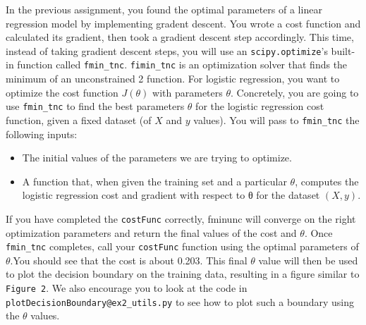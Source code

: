 \documentclass[11pt]{article}
\providecommand{\tightlist}{%
      \setlength{\itemsep}{0pt}\setlength{\parskip}{0pt}}
\begin{document}
In the previous assignment, you found the optimal parameters of a linear
regression model by implementing gradent descent. You wrote a cost
function and calculated its gradient, then took a gradient descent step
accordingly. This time, instead of taking gradient descent steps, you
will use an \texttt{scipy.optimize}'s built-in function called
\texttt{fmin\_tnc}. \texttt{fimin\_tnc} is an optimization solver that
finds the minimum of an unconstrained 2 function. For logistic
regression, you want to optimize the cost function \(J(\theta)\) with
parameters \(\theta\). Concretely, you are going to use
\texttt{fmin\_tnc} to find the best parameters \(\theta\) for the
logistic regression cost function, given a fixed dataset (of \(X\) and
\(y\) values). You will pass to \texttt{fmin\_tnc} the following inputs:

\begin{itemize}
\tightlist
\item
  The initial values of the parameters we are trying to optimize.
\item
  A function that, when given the training set and a particular
  \(\theta\), computes the logistic regression cost and gradient with
  respect to θ for the dataset \((X, y)\).
\end{itemize}

    If you have completed the \texttt{costFunc} correctly, fminunc will
converge on the right optimization parameters and return the final
values of the cost and \(\theta\). Once \texttt{fmin\_tnc} completes,
call your \texttt{costFunc} function using the optimal parameters of
\(\theta\).You should see that the cost is about 0.203. This final
\(\theta\) value will then be used to plot the decision boundary on the
training data, resulting in a figure similar to \texttt{Figure\ 2}. We
also encourage you to look at the code in
\texttt{plotDecisionBoundary@ex2\_utils.py} to see how to plot such a
boundary using the \(\theta\) values.
\end{document}
